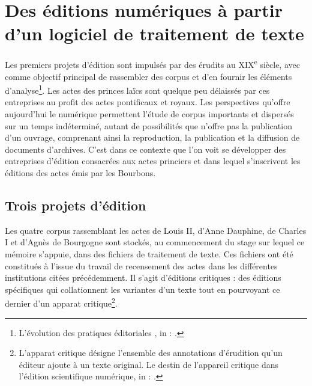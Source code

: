\newpage
\thispagestyle{empty}
\mbox{}
\newpage
 
	\chapter[Éditions numériques]{Des éditions numériques à partir d'un logiciel de traitement de texte}

\par Les premiers projets d'édition sont impulsés par des érudits au \textsc{XIX}\textsuperscript{e} siècle, avec comme objectif principal de rassembler des corpus et d'en fournir les éléments d'analyse\footnote{\og L'évolution des pratiques éditoriales \fg, in : \cite{guyotjeanninConseilsPourEdition2009}.}. Les actes des princes laïcs sont quelque peu délaissés par ces entreprises au profit des actes pontificaux et royaux. Les perspectives qu'offre aujourd'hui le numérique permettent l'étude de corpus importants et dispersés sur un temps indéterminé, autant de possibilités que n'offre pas la publication d'un ouvrage, comprenant ainsi la reproduction, la publication et la diffusion de documents d'archives. C'est dans ce contexte que l'on voit se développer des entreprises d'édition consacrées aux actes princiers et dans lequel s'inscrivent les éditions des actes émis par les Bourbons. 
\newpage 

\section{Trois projets d'édition}
\label{I.2.1}

\par Les quatre corpus rassemblant les actes de Louis II, d'Anne Dauphine, de Charles I et d'Agnès de Bourgogne sont stockés, au commencement du stage sur lequel ce mémoire s'appuie, dans des fichiers de traitement de texte. Ces fichiers ont été constitués à l'issue du travail de recensement des actes dans les différentes institutions citées précédemment. Il s'agit d'éditions critiques : des éditions spécifiques qui collationnent les variantes d’un texte tout en pourvoyant ce dernier d’un apparat critique\footnote{L'apparat critique désigne l'ensemble des annotations d'érudition qu'un éditeur ajoute à un texte original. \og Le destin de l'appareil critique dans l'édition scientifique numérique\fg, in : \cite{apollonEditionCritiqueEre2017}.}. 
\newline 

